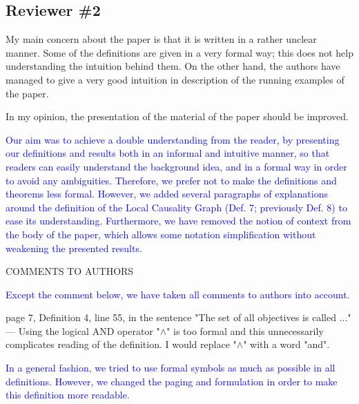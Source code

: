 \documentclass[11pt]{article}
\newcommand{\ilanswer}[1]{\textcolor{blue}{#1}}
\newcommand{\answer}[1]{\ilanswer{#1}\vspace*{1em}}
\begin{document}





\subsection*{Reviewer \#2}

My main concern about the paper is that it is written in a rather unclear manner. Some of the definitions are given in a very formal way; this does not help understanding the intuition behind them. On the other hand, the authors have managed to give a very good intuition in description of the running examples of the paper.

In my opinion, the presentation of the material of the paper should be improved.

\answer{Our aim was to achieve a double understanding from the reader,
by presenting our definitions and results both in an informal and intuitive manner,
so that readers can easily understand the background idea,
and in a formal way in order to avoid any ambiguities.
Therefore, we prefer not to make the definitions and theorems less formal.
However, we added several paragraphs of explanations around the definition of the Local Causality Graph (Def. 7; previously Def. 8) to ease its understanding.
Furthermore, we have removed the notion of context from the body of the paper,
which allows some notation simplification without weakening the presented results.
}

\noindent
COMMENTS TO AUTHORS

\answer{Except the comment below, we have taken all comments to authors into account.}

\noindent
page 7, Definition 4, line 55, in the sentence "The set of all objectives is called ..." ---
Using the logical AND operator "$\land$" is too formal and this unnecessarily complicates reading of the definition.
I would replace "$\land$" with a word "and".

\answer{In a general fashion, we tried to use formal symbols as much as possible in all definitions.
However, we changed the paging and formulation in order to make this definition more readable.}

%
\end{document}
